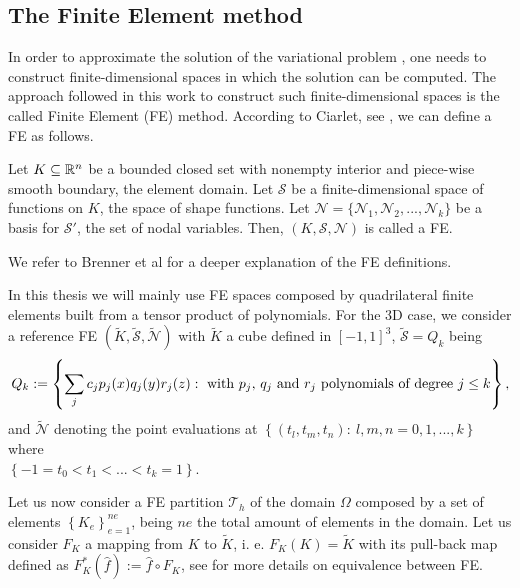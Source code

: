 \subsection{The Finite Element method}
\label{subsec-variational_finite_element}
In order to approximate the solution of the variational problem , one needs to construct finite-dimensional spaces in which the solution can be computed. The approach followed in this work to construct such finite-dimensional spaces is the called Finite Element (FE) method. According to Ciarlet, see \cite{ciarlet_finite_1978}, we can define a FE as follows.

Let $ K\subseteq\mathbb{R}^n $ be a bounded closed set with nonempty interior and piece-wise smooth boundary, the element domain. Let $ \mathcal{S} $ be a finite-dimensional space of functions on $ K $, the space of shape functions. Let $ \mathcal{N}=\{\mathcal{N}_1,\mathcal{N}_2,...,\mathcal{N}_k\} $ be a basis for $ \mathcal{S}' $, the set of nodal variables. Then, $ (K,\mathcal{S},\mathcal{N}) $ is called a FE.

We refer to Brenner et al \cite{brenner_mathematical_2007} for a deeper explanation of the FE definitions.

In this thesis we will mainly use FE spaces composed by quadrilateral finite elements built from a tensor product of polynomials. For the 3D case, we consider a reference FE $ (\widetilde{K},\widetilde{\mathcal{S}},\widetilde{\mathcal{N}}) $ with $ \widetilde{K} $ a cube defined in $ [-1,1]^3 $, $ \widetilde{\mathcal{S}}=Q_k $ being
$$ Q_k:=\left\{\sum_jc_jp_j(x)q_j(y)r_j(z):\mbox{ with $ p_j $, $ q_j $ and $ r_j $ polynomials of degree $j \leq k $}\right\}, $$
and $ \widetilde{\mathcal{N}} $ denoting the point evaluations at $ \left\{(t_l,t_m,t_n):\ l,m,n=0,1,...,k \right\} $ where \\$\left\{-1 = t_0 < t_1 < ... < t_k = 1 \right\}$.

Let us now consider a FE partition $ \mathcal{T}_h $ of the domain $ \Omega $ composed by a set of elements $ \left\{K_e\right\}_{e=1}^{ne} $, being $ ne $ the total amount of elements in the domain. Let us consider $ F_K $ a mapping from $ K $ to $ \widetilde{K} $, i. e. $ F_K(K)=\widetilde{K} $ with its pull-back map defined as $ F^*_K(\hat{f}):=\hat{f}\circ F_K $, see \cite{ciarlet_general_1972,brenner_mathematical_2007} for more details on equivalence between FE.

